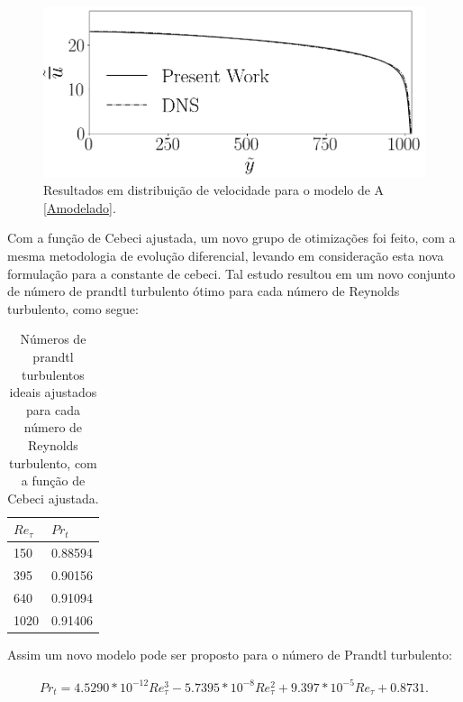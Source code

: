 \begin{figure}[!h]
\begin{minipage}[t]{0.5\textwidth}
	\end{minipage}
	\begin{minipage}[t]{0.45\textwidth}
		\centering
		\includegraphics[angle=0, scale=0.34]{fotos_formatacao_final/Temperature_1000_Amodeled}
	\end{minipage}	
	\caption{Resultados em distribuição de velocidade para o modelo de A \ref{Amodelado}.}
\end{figure}

Com a função de Cebeci ajustada, um novo grupo de otimizações foi feito, com a mesma metodologia de evolução diferencial, levando em consideração esta nova formulação para a constante de cebeci. Tal estudo resultou em um novo conjunto de número de prandtl turbulento ótimo para cada número de 
Reynolds turbulento, como segue:

\begin{table}[!h]
	\centering
	\caption{Números de prandtl turbulentos ideais ajustados para cada número de Reynolds turbulento, com a função de Cebeci ajustada.}
	\begin{tabular}{ll}
		\hline
		$Re_\tau$ & $Pr_t$\\
		\hline
		150  &   0.88594\\
		395  &   0.90156\\
		640  &   0.91094\\
		1020 &   0.91406\\ 
		\hline
	\end{tabular}
\end{table}

Assim um novo modelo pode ser proposto para o número de Prandtl turbulento:

\begin{equation}
  \begin{split}
    Pr_t = 4.5290 * 10^{-12} Re_\tau^3 - 5.7395 * 10^{-8} Re_\tau^2 + 9.397 * 10^{-5} Re_\tau + 0.8731.
  \end{split}
\end{equation}

